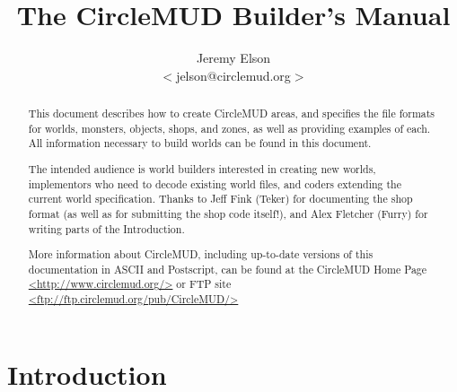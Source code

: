 \documentclass[11pt]{article}
\title{The CircleMUD Builder's Manual}
\author{Jeremy Elson\\
$<$jelson@circlemud.org$>$}
\begin{document}
\maketitle

\begin{abstract}
This document describes how to create CircleMUD areas, and specifies the file formats for worlds, monsters, objects, shops, and zones, as well as providing examples of each.  All information necessary to build worlds can be found in this document.
\par
The intended audience is world builders interested in creating new worlds, implementors who need to decode existing world files, and coders extending the current world specification. Thanks to Jeff Fink (Teker) for documenting the shop format (as well as for submitting the shop code itself!), and Alex Fletcher (Furry) for writing parts of the Introduction.
\par
More information about CircleMUD, including up-to-date versions of this documentation in ASCII and Postscript, can be found at the CircleMUD Home Page \url{<http://www.circlemud.org/>} or 
FTP site \url{<ftp://ftp.circlemud.org/pub/CircleMUD/>}
\end{abstract}

\tableofcontents

\section{Introduction}
\end{document}
